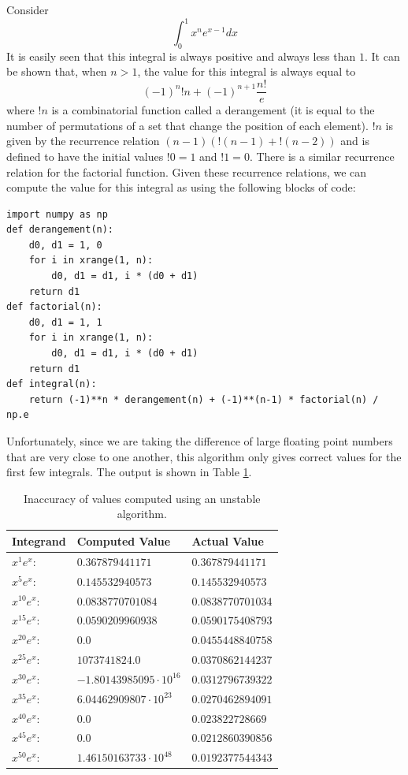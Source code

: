 \begin{example}
Consider
\[\int_0^1 x^n e^{x - 1} dx\]
It is easily seen that this integral is always positive and always less than $1$.
It can be shown that, when $n > 1$, the value for this integral is always equal to
\[\left(-1\right)^{n} !n + \left(-1\right)^{n + 1} \frac{n!}{e}\]
where $!n$ is a combinatorial function called a derangement (it is equal to the number of permutations of a set that change the position of each element).
$!n$ is given by the recurrence relation $\left(n - 1\right)\left(!\left(n - 1\right) + !\left(n - 2\right)\right)$ and is defined to have the initial values $!0 = 1$ and $!1 = 0$.
There is a similar recurrence relation for the factorial function.
Given these recurrence relations, we can compute the value for this integral as using the following blocks of code:
\begin{lstlisting}
import numpy as np
def derangement(n):
    d0, d1 = 1, 0
    for i in xrange(1, n):
        d0, d1 = d1, i * (d0 + d1)
    return d1
def factorial(n):
    d0, d1 = 1, 1
    for i in xrange(1, n):
        d0, d1 = d1, i * (d0 + d1)
    return d1
def integral(n):
    return (-1)**n * derangement(n) + (-1)**(n-1) * factorial(n) / np.e
\end{lstlisting}
Unfortunately, since we are taking the difference of large floating point numbers that are very close to one another, this algorithm only gives correct values for the first few integrals.
The output is shown in Table \ref{table:unstable_computation}.

\begin{table}
\centering
\begin{tabular}{|l|l|l|}
\hline
Integrand & Computed Value & Actual Value \\
\hline
$x^{1}e^{x}$: & $0.367879441171$ & $0.367879441171$ \\
$x^{5}e^{x}$: & $0.145532940573$ & $0.145532940573$ \\
$x^{10}e^{x}$: & $0.0838770701084$ & $0.0838770701034$ \\
$x^{15}e^{x}$: & $0.0590209960938$ & $0.0590175408793$ \\
$x^{20}e^{x}$: & $0.0$ & $0.0455448840758$ \\
$x^{25}e^{x}$: & $1073741824.0$ & $0.0370862144237$ \\
$x^{30}e^{x}$: & $-1.80143985095 \cdot 10^{16}$ & $0.0312796739322$ \\
$x^{35}e^{x}$: & $6.04462909807 \cdot 10^{23}$ & $0.0270462894091$ \\
$x^{40}e^{x}$: & $0.0$ & $0.023822728669$ \\
$x^{45}e^{x}$: & $0.0$ & $0.0212860390856$ \\
$x^{50}e^{x}$: & $1.46150163733 \cdot 10^{48}$ & $0.0192377544343$ \\
\hline
\end{tabular}
\caption{Inaccuracy of values computed using an unstable algorithm.}
\label{table:unstable_computation}
\end{table}


\end{example}
